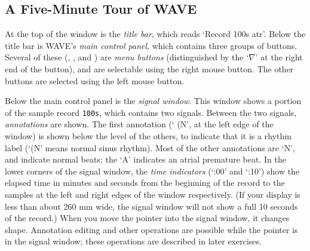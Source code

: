 \documentclass[twoside]{book}
\newcommand{\button}[1]{\cornersize{2}\ovalbox{\rule[-.3mm]{0cm}{2.5mm}\small\sf ~#1~}}
\newcommand{\menubutton}[1]{\button{#1~\ensuremath{\nabla}}}
\newcommand{\WAVE}{{\sf WAVE}\xspace}
\begin{document}
\subsection*{A Five-Minute Tour of \WAVE{}}

\begin{htmlonly}
\end{htmlonly}
\begin{latexonly}
\end{latexonly}
At the top of the window is the \emph{title bar}, which reads `{\sf Record 100s
atr}'.  Below the title bar is \WAVE{}'s \emph{main control panel}, which
contains three groups of buttons.  Several of these (\menubutton{File},
\menubutton{Edit}, and \menubutton{Properties}) are \emph{menu buttons}
(distinguished by the `$\nabla$' at the right end of the button), and are
selectable using the right mouse button.  The other buttons are selected using
the left mouse button.

\begin{htmlonly}
\end{htmlonly}
\begin{latexonly}
\end{latexonly}
Below the main control panel is the \emph{signal window}.  This window shows a
portion of the sample record {\tt 100s}, which contains two signals.  Between
the two signals, \emph{annotations} are shown.  The first annotation (`{\sf
(N}', at the left edge of the window) is shown below the level of the others,
to indicate that it is a rhythm label (`{\sf (N}' means normal sinus rhythm).
Most of the other annotations are `{\sf N}', and indicate normal beats; the
`{\sf A}' indicates an atrial premature beat.  In the lower corners of the
signal window, the \emph{time indicators} (`{:00}' and `{:10}') show
the elapsed time in minutes and seconds from the beginning of the record to the
samples at the left and right edges of the window respectively.  (If your
display is less than about 260 mm wide, the signal window will not show a full
10 seconds of the record.)  When you move the pointer into the signal window,
it changes shape.  Annotation editing and other operations are possible while
the pointer is in the signal window; these operations are described in later
exercises.
\end{document}
